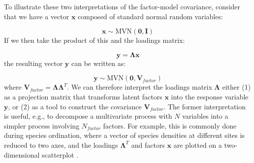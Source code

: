 To illustrate these two interpretations of the factor-model covariance, consider that we have a vector \(\mathbf{x}\) composed of standard normal random variables:

\begin{equation}
    \mathbf{x} \sim \mathrm{MVN}( \mathbf{0}, \mathbf{I} )    
\end{equation}
If we then take the product of this and the loadings matrix:

\begin{equation}
    \mathbf{y} = \mathbf{\Lambda x}    
\end{equation}
the resulting vector \(\mathbf{y}\) can be written as:

\begin{equation}
    \mathbf{y} \sim \mathrm{MVN}( \mathbf{0}, \mathbf{V}_{factor} )    
\end{equation}
where \( \mathbf{V}_{factor} = \mathbf{\Lambda \Lambda}^T \). We can therefore interpret the loadings matrix \( \mathbf{\Lambda} \) either (1) as a projection matrix that transforms latent factors \(\mathbf{x}\) into the response variable \(\mathbf{y}\), or (2) as a tool to construct the covariance \( \mathbf{V}_{factor} \).  The former interpretation is useful, e.g., to decompose a multivariate process with \(N\) variables into a simpler process involving \(N_{factor}\) factors.  For example, this is commonly done during species ordination, where a vector of species densities at different sites is reduced to two axes, and the loadings \( \mathbf{\Lambda}^T \) and factors \( \mathbf{x} \) are plotted on a two-dimensional scatterplot \cite{mccune_analysis_2002}.  

